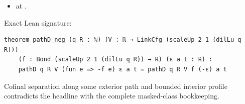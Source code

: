 \begin{theorem}[bp-105]
\begin{itemize}
\item \texttt{} at \texttt{}.
\end{itemize}
\par Exact Lean signature:
\begin{verbatim}
theorem pathD_neg (q R : ℕ) (V : ℝ → LinkCfg (scaleUp 2 1 (dilLu q R)))
    (f : Bond (scaleUp 2 1 (dilLu q R)) → ℝ) (ε a t : ℝ) :
    pathD q R V (fun e => -f e) ε a t = pathD q R V f (-ε) a t
\end{verbatim}
\end{theorem}

\begin{theorem}[bp-106]
\label{bp-106}
\leanok
Cofinal separation along some exterior path and bounded interior profile contradicts the headline with the complete masked-class bookkeeping.


\end{theorem}

